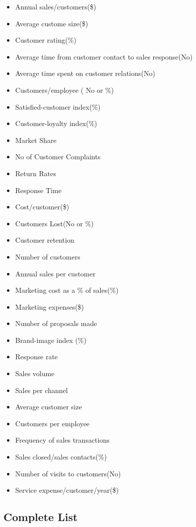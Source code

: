 \documentclass[]{book}
\providecommand{\tightlist}{%
  \setlength{\itemsep}{0pt}\setlength{\parskip}{0pt}}
\begin{document}
\begin{itemize}
\tightlist
\item
  Annual sales/customers(\$)
\item
  Average custome size(\$)
\item
  Customer rating(\%)
\item
  Average time from customer contact to sales response(No)
\item
  Average time spent on customer relations(No)
\item
  Customers/employee ( No or \%)
\item
  Satisfied-customer index(\%)
\item
  Customer-loyalty index(\%)
\item
  Market Share
\item
  No of Customer Complaints
\item
  Return Rates
\item
  Response Time
\item
  Cost/customer(\$)
\item
  Customers Lost(No or \%)
\item
  Customer retention
\item
  Number of customers
\item
  Annual sales per customer
\item
  Marketing cost as a \% of sales(\%)
\item
  Marketing expenses(\$)
\item
  Number of proposals made
\item
  Brand-image index (\%)
\item
  Response rate
\item
  Sales volume
\item
  Sales per channel
\item
  Average customer size
\item
  Customers per employee
\item
  Frequency of sales transactions
\item
  Sales closed/sales contacts(\%)
\item
  Number of visits to customers(No)
\item
  Service expense/customer/year(\$)
\end{itemize}

\subsection{Complete List}\label{complete-list-1}
\end{document}
